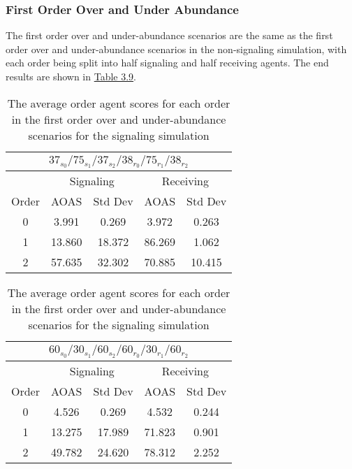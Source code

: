 \subsubsection{First Order Over and Under Abundance}

The first order over and under-abundance scenarios are the same as the first order over and under-abundance scenarios in the non-signaling simulation, with each order being split into half signaling and half receiving agents. The end results are shown in \hyperref[table:sig-first-order-simple]{Table 3.9}.

\begin{table}[h]
    \centering
    \begin{tabular}{|c|c|c|c|c|}
    \hline
    \multicolumn{5}{|c|}{$37_{s_{0}}/75_{s_{1}}/37_{s_{2}}/38_{r_{0}}/75_{r_{1}}/38_{r_{2}}$} \\
    \hline
    \multicolumn{1}{|c|}{} & \multicolumn{2}{|c|}{Signaling} & \multicolumn{2}{|c|}{Receiving} \\
    \hline
    Order & AOAS & Std Dev & AOAS & Std Dev \\
    \hline
    0     & 3.991   & 0.269    & 3.972   & 0.263   \\
    1     & 13.860  & 18.372   & 86.269  & 1.062   \\
    2     & 57.635  & 32.302   & 70.885  & 10.415   \\
    \hline
    \end{tabular}
    \qquad
    \begin{tabular}{|c|c|c|c|c|}
        \hline
        \multicolumn{5}{|c|}{$60_{s_{0}}/30_{s_{1}}/60_{s_{2}}/60_{r_{0}}/30_{r_{1}}/60_{r_{2}}$} \\
        \hline
        \multicolumn{1}{|c|}{} & \multicolumn{2}{|c|}{Signaling} & \multicolumn{2}{|c|}{Receiving} \\
        \hline
        Order & AOAS & Std Dev & AOAS & Std Dev \\
        \hline
        0     & 4.526   & 0.269    & 4.532   & 0.244   \\
        1     & 13.275  & 17.989   & 71.823  & 0.901   \\
        2     & 49.782  & 24.620   & 78.312  & 2.252   \\
        \hline
    \end{tabular}
    \caption{The average order agent scores for each order in the first order over and under-abundance scenarios for the signaling simulation}
    \label{table:sig-first-order-simple}
\end{table}


